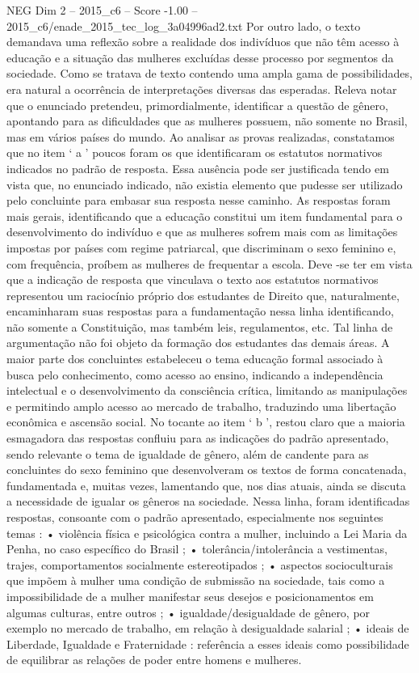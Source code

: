 \begin{textsample}{NEG Dim 2 – 2015\_c6 – Score -1.00 – 2015\_c6/enade\_2015\_tec\_log\_3a04996ad2.txt}
Por outro lado, o texto demandava uma reflexão sobre a realidade dos indivíduos que não têm acesso à educação e a situação das mulheres excluídas desse processo por segmentos da sociedade.
Como se tratava de texto contendo uma ampla gama de possibilidades, era natural a ocorrência de interpretações diversas das esperadas.
Releva notar que o enunciado pretendeu, primordialmente, identificar a questão de gênero, apontando para as dificuldades que as mulheres possuem, não somente no Brasil, mas em vários países do mundo.
Ao analisar as provas realizadas, constatamos que no item ‘ a ’ poucos foram os que identificaram os estatutos normativos indicados no padrão de resposta.
Essa ausência pode ser justificada tendo em vista que, no enunciado indicado, não existia elemento que pudesse ser utilizado pelo concluinte para embasar sua resposta nesse caminho.
As respostas foram mais gerais, identificando que a educação constitui um item fundamental para o desenvolvimento do indivíduo e que as mulheres sofrem mais com as limitações impostas por países com regime patriarcal, que discriminam o sexo feminino e, com frequência, proíbem as mulheres de frequentar a escola.
Deve -se ter em vista que a indicação de resposta que vinculava o texto aos estatutos normativos representou um raciocínio próprio dos estudantes de Direito que, naturalmente, encaminharam suas respostas para a fundamentação nessa linha identificando, não somente a Constituição, mas também leis, regulamentos, etc.
Tal linha de argumentação não foi objeto da formação dos estudantes das demais áreas.
A maior parte dos concluintes estabeleceu o tema educação formal associado à busca pelo conhecimento, como acesso ao ensino, indicando a independência intelectual e o desenvolvimento da consciência crítica, limitando as manipulações e permitindo amplo acesso ao mercado de trabalho, traduzindo uma libertação econômica e ascensão social.
No tocante ao item ‘ b ’, restou claro que a maioria esmagadora das respostas confluiu para as indicações do padrão apresentado, sendo relevante o tema de igualdade de gênero, além de candente para as concluintes do sexo feminino que desenvolveram os textos de forma concatenada, fundamentada e, muitas vezes, lamentando que, nos dias atuais, ainda se discuta a necessidade de igualar os gêneros na sociedade.
Nessa linha, foram identificadas respostas, consoante com o padrão apresentado, especialmente nos seguintes temas : • violência física e psicológica contra a mulher, incluindo a Lei Maria da Penha, no caso específico do Brasil ; • tolerância/intolerância a vestimentas, trajes, comportamentos socialmente estereotipados ; • aspectos socioculturais que impõem à mulher uma condição de submissão na sociedade, tais como a impossibilidade de a mulher manifestar seus desejos e posicionamentos em algumas culturas, entre outros ; • igualdade/desigualdade de gênero, por exemplo no mercado de trabalho, em relação à desigualdade salarial ; • ideais de Liberdade, Igualdade e Fraternidade : referência a esses ideais como possibilidade de equilibrar as relações de poder entre homens e mulheres.

\end{textsample}
